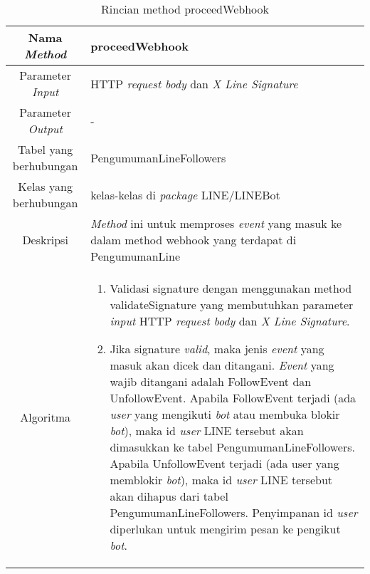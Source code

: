 \begin{center}
	\begin{table}[H]
	\caption{Rincian method proceedWebhook}
	\label{table:pengumuman-line-model-proceedwebhook}
\begin{tabular}{|c|p{11cm}|}
\hline
Nama \textit{Method} 	& 	 proceedWebhook	\\
\hline
Parameter \textit{Input} & HTTP \textit{request body} dan \textit{X Line Signature} \\
\hline
Parameter \textit{Output} & - \\
\hline
Tabel yang berhubungan & PengumumanLineFollowers\\
\hline
Kelas yang berhubungan & kelas-kelas di \textit{package} LINE/LINEBot \\
\hline
Deskripsi	& \textit{Method} ini untuk memproses \textit{event} yang masuk ke dalam method webhook yang terdapat di PengumumanLine\\
\hline
Algoritma	& \begin{enumerate}
				\item Validasi signature dengan menggunakan method validateSignature yang membutuhkan parameter \textit{input} HTTP \textit{request body} dan \textit{X Line Signature}.
				\item Jika signature \textit{valid}, maka jenis \textit{event} yang masuk akan dicek dan ditangani. \textit{Event} yang wajib ditangani adalah FollowEvent dan UnfollowEvent. Apabila FollowEvent terjadi (ada \textit{user} yang mengikuti \textit{bot} atau membuka blokir \textit{bot}), maka id \textit{user} LINE tersebut akan dimasukkan ke tabel PengumumanLineFollowers. Apabila UnfollowEvent terjadi (ada user yang memblokir \textit{bot}), maka id \textit{user} LINE tersebut akan dihapus dari tabel PengumumanLineFollowers. Penyimpanan id \textit{user} diperlukan untuk mengirim pesan ke pengikut \textit{bot}.
				\end{enumerate} \\
\hline
\end{tabular}
\end{table}
\end{center}

